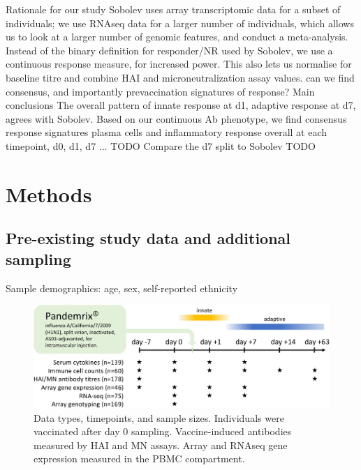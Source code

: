 \begin{outline}

    \1 Rationale for our study
        \2 Sobolev uses array transcriptomic data for a subset of individuals; we use RNAseq data for a larger number of individuals, which allows us to look at a larger number of genomic features, and conduct a meta-analysis.
        \2 Instead of the binary definition for responder/NR used by Sobolev, we use a continuous response measure, for increased power. This also lets us normalise for baseline titre and combine HAI and microneutralization assay values.
            \3 can we find consensus, and importantly prevaccination signatures of response?
    \1 Main conclusions
        \2 The overall pattern of innate response at d1, adaptive response at d7, agrees with Sobolev.
        \2 Based on our continuous Ab phenotype, we find consensus response signatures
            \3 plasma cells and inflammatory response overall
            \3 at each timepoint, d0, d1, d7 ... TODO
                \4 Compare the d7 split to Sobolev TODO 

\end{outline}

\section{Methods}

\subsection{Pre-existing  study data and additional sampling}

Sample demographics: age, sex, self-reported ethnicity

\begin{figure}
    \includegraphics[width=1.0\textwidth]{./mainmatter/figures/chapter_02/graphics/hird_design-crop.pdf}
    \caption{Data types, timepoints, and sample sizes. Individuals were vaccinated after day 0 sampling. Vaccine-induced antibodies measured by \gls{HAI} and \gls{MN} assays. Array and \gls{RNAseq} gene expression measured in the \gls{PBMC} compartment.}
    \label{fig:hird_design}
\end{figure}

